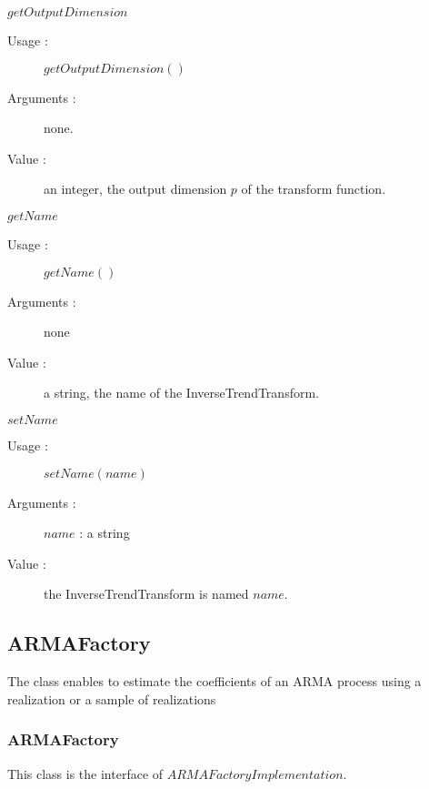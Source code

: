 \begin{description}
\begin{description}
   \item $getOutputDimension$
    \begin{description}
    \item[Usage :] $getOutputDimension()$
    \item[Arguments :] none.
    \item[Value :]   an integer, the output dimension $p$ of the transform function. 
    \end{description}
    \bigskip

  \item $getName$
    \begin{description}
    \item[Usage :] $getName()$
    \item[Arguments :] none
    \item[Value :] a string, the name of the InverseTrendTransform.
    \end{description}
    \bigskip

  \item $setName$
    \begin{description}
    \item[Usage :] $setName(name)$
    \item[Arguments :] $name$ : a string
    \item[Value :] the InverseTrendTransform is named $name$.
    \end{description}
    \bigskip

  \end{description}

\end{description}


\newpage \subsection{ARMAFactory}

The class enables to estimate the coefficients of an ARMA process using a realization or a sample of realizations

\subsubsection{ARMAFactory}

This class is the interface of $ARMAFactoryImplementation$.\\

